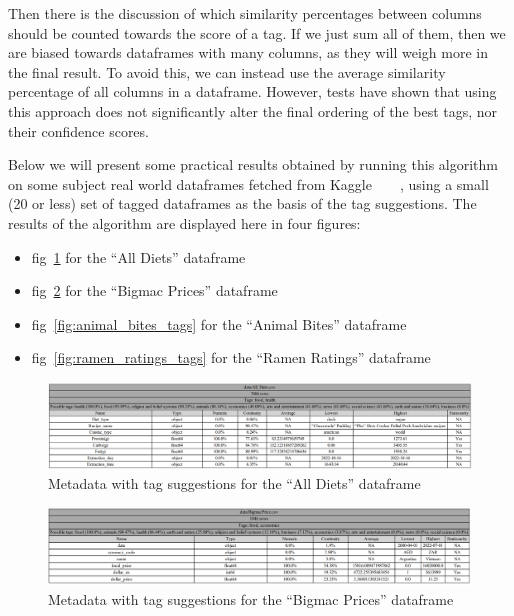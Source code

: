Then there is the discussion of which similarity percentages between columns should be counted towards the score of a tag.
If we just sum all of them, then we are biased towards dataframes with many columns, as they will weigh more in the final
result.
To avoid this, we can instead use the average similarity percentage of all columns in a dataframe.
However, tests have shown that using this approach does not significantly alter the final ordering of the best tags, nor
their confidence scores.

Below we will present some practical results obtained by running this algorithm on some subject real world dataframes fetched
from Kaggle~~~~\cite{kaggleHealthAnimalBites,kaggleBigmacPrices,kaggleAllDiets,kaggleRamenRatings}, using a small (20 or less)
set of tagged dataframes as the basis of the tag suggestions.
The results of the algorithm are displayed here in four figures:

\begin{itemize}
    \item fig~\ref{fig:all_diets_tags} for the ``All Diets'' dataframe
    \item fig~\ref{fig:bigmac_price_tags} for the ``Bigmac Prices'' dataframe
    \item fig~\ref{fig:animal_bites_tags} for the ``Animal Bites'' dataframe
    \item fig~\ref{fig:ramen_ratings_tags} for the ``Ramen Ratings'' dataframe
\end{itemize}

\begin{figure}[h]
    \centering
    \includegraphics[width=12cm]{figures/tag_suggestions/all_diets_tags}
    \caption{Metadata with tag suggestions for the ``All Diets'' dataframe}
    \label{fig:all_diets_tags}
\end{figure}

\begin{figure}[h]
    \centering
    \includegraphics[width=12cm]{figures/tag_suggestions/bigmac_price_tags}
    \caption{Metadata with tag suggestions for the ``Bigmac Prices'' dataframe}
    \label{fig:bigmac_price_tags}
\end{figure}

